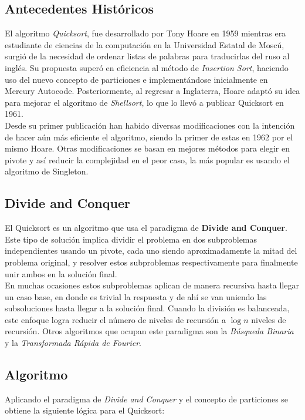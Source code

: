 \documentclass[conference]{IEEEtran}
\begin{document}
\subsection{Antecedentes Históricos}
El algoritmo \textit{Quicksort}, fue desarrollado por Tony Hoare en 1959 mientras era estudiante de ciencias de la computación en la Universidad Estatal de Moscú, 
surgió de la necesidad de ordenar listas de palabras para traducirlas del ruso al inglés. 
Su propuesta superó en eficiencia al método de \textit{Insertion Sort}, haciendo uso del nuevo concepto de particiones e implementándose inicialmente en Mercury Autocode. 
Posteriormente, al regresar a Inglaterra, Hoare adaptó su idea para mejorar el algoritmo de \textit{Shellsort}, lo que lo llevó a publicar Quicksort en 1961.\cite{original_paper}
\\
Desde su primer publicación han habido diversas modificaciones con la intención de hacer aún más eficiente el algoritmo, siendo la primer de estas en 1962 por el mismo Hoare.
Otras modificaciones se basan en mejores métodos para elegir en pivote y así reducir la complejidad en el peor caso, la más popular es usando el algoritmo de Singleton.
\cite{history} 

\subsection{Divide and Conquer}
El Quicksort es un algoritmo que usa el paradigma de \textbf{Divide and Conquer}. 
Este tipo de solución implica dividir el problema en dos subproblemas independientes usando un pivote, 
cada uno siendo aproximadamente la mitad del problema original, y resolver estos subproblemas respectivamente para finalmente unir ambos en la solución final.\\
En muchas ocasiones estos subproblemas aplican de manera recursiva hasta llegar un caso base, en donde es trivial la respuesta y de ahí se van uniendo las subsoluciones hasta llegar a la solución final.
Cuando la división es balanceada, este enfoque logra reducir el número de niveles de recursión a $\log{n}$ niveles de recursión.
Otros algoritmos que ocupan este paradigma son la \textit{Búsqueda Binaria} y la \textit{Transformada Rápida de Fourier}.
\cite{divide_and_conquer}


\subsection{Algoritmo}
Aplicando el paradigma de \textit{Divide and Conquer} y el concepto de particiones se obtiene la siguiente lógica para el Quicksort\cite{Grokking}:
\end{document}
